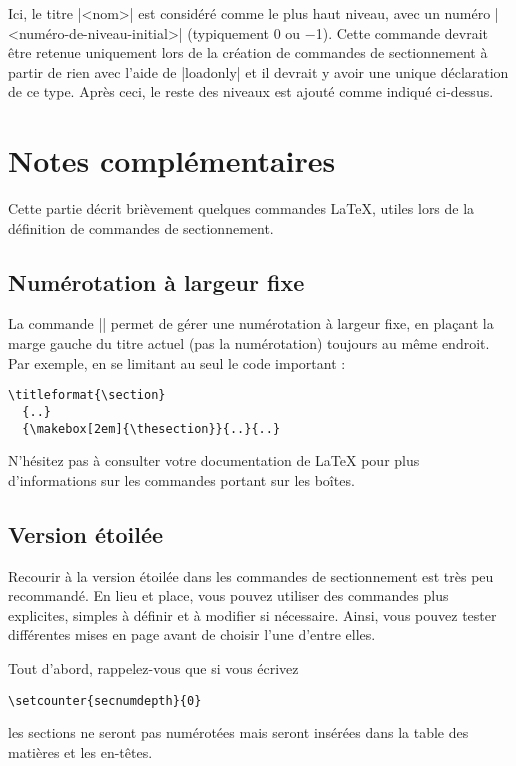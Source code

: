 \documentclass[a4paper]{ltxguide}
\begin{document}
Ici, le titre |<nom>| est considéré comme le plus haut niveau, avec un
numéro |<numéro-de-niveau-initial>| (typiquement 0 ou $-$1). Cette commande
devrait être retenue uniquement lors de la création de commandes de 
sectionnement à partir de rien avec l'aide de |loadonly| et il devrait y avoir une unique déclaration de ce type. Après ceci, le reste des niveaux est ajouté comme indiqué ci-dessus.

\section{Notes complémentaires}

Cette partie décrit brièvement quelques commandes \LaTeX{}, utiles lors de la
définition de commandes de sectionnement.

\subsection{Numérotation à largeur fixe}

La commande |\makebox| permet de gérer une numérotation à largeur fixe, en
plaçant la marge gauche du titre actuel (pas la numérotation) toujours au même
endroit. Par exemple, en se limitant au seul le code important :
\begin{verbatim}
\titleformat{\section}
  {..}
  {\makebox[2em]{\thesection}}{..}{..}
\end{verbatim}

N'hésitez pas à consulter votre documentation de \LaTeX{} pour plus
d'informations sur les commandes portant sur les boîtes.

\subsection{Version étoilée} \label{s:starred}


Recourir à la version étoilée dans les commandes de sectionnement est très 
peu recommandé. En lieu et place, vous pouvez utiliser des commandes plus
explicites, simples à définir et à modifier si nécessaire. Ainsi, vous pouvez
tester différentes mises en page avant de choisir l'une d'entre elles.

Tout d'abord, rappelez-vous que si vous écrivez
\begin{verbatim}
\setcounter{secnumdepth}{0}
\end{verbatim}
les sections ne seront pas numérotées mais seront insérées dans la table des
matières et les en-têtes.
\end{document}
